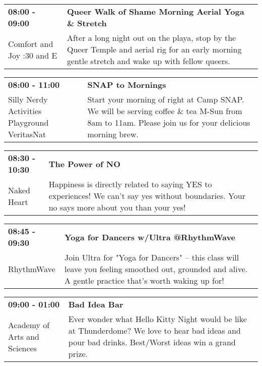 \begin{tabular}{ p{1in} p{2.2in} }
    \textbf{08:00 - 09:00} & \textbf{Queer Walk of Shame Morning Aerial Yoga \& Stretch} \\
    Comfort and Joy \newline 7:30 and E & After a long night out on the playa, stop by the Queer Temple and aerial rig for an early morning gentle stretch and wake up with fellow queers. \\
    \hline 
\end{tabular}
    
\begin{tabular}{ p{1in} p{2.2in} }
    \textbf{08:00 - 11:00} & \textbf{SNAP to Mornings} \\
    Silly Nerdy Activities Playground \newline VeritasNat & Start your morning of right at Camp SNAP. We will be serving coffee \& tea M-Sun from 8am to 11am. Please join us for your delicious morning brew. \\
    \hline 
\end{tabular}
    
\begin{tabular}{ p{1in} p{2.2in} }
    \textbf{08:30 - 10:30} & \textbf{The Power of NO } \\
    Naked Heart \newline  & Happiness is directly related to saying YES to experiences! We can't say yes without boundaries. Your no says more about you than your yes! \\
    \hline 
\end{tabular}
    
\begin{tabular}{ p{1in} p{2.2in} }
    \textbf{08:45 - 09:30} & \textbf{Yoga for Dancers w/Ultra @RhythmWave} \\
    RhythmWave \newline  & Join Ultra for "Yoga for Dancers" -- this class will leave you feeling smoothed out, grounded and alive. A gentle practice that's worth waking up for! \\
    \hline 
\end{tabular}
    
\begin{tabular}{ p{1in} p{2.2in} }
    \textbf{09:00 - 01:00} & \textbf{Bad Idea Bar} \\
    Academy of Arts and Sciences \newline  & Ever wonder what Hello Kitty Night would be like at Thunderdome? We love to hear bad ideas and pour bad drinks. Best/Worst ideas win a grand prize. \\
    \hline 
\end{tabular}
    
